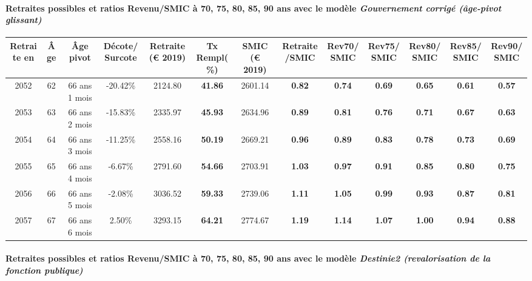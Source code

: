 \paragraph{Retraites possibles et ratios Revenu/SMIC à 70, 75, 80, 85, 90 ans avec le modèle \emph{Gouvernement corrigé (âge-pivot glissant)}}  
 
{ \scriptsize \begin{center} 
\begin{tabular}[htb]{|c|c||c|c||c|c||c||c|c|c|c|c|c|} 
\hline 
 Retraite en &  Âge &  Âge pivot &  Décote/Surcote &  Retraite (\euro{} 2019) &  Tx Rempl(\%) &  SMIC (\euro{} 2019) &  Retraite/SMIC &  Rev70/SMIC &  Rev75/SMIC &  Rev80/SMIC &  Rev85/SMIC &  Rev90/SMIC \\ 
\hline \hline 
 2052 &  62 &  66 ans 1 mois &  -20.42\% &  2124.80 &  {\bf 41.86} &  2601.14 &  {\bf {\color{red} 0.82}} &  {\bf {\color{red} 0.74}} &  {\bf {\color{red} 0.69}} &  {\bf {\color{red} 0.65}} &  {\bf {\color{red} 0.61}} &  {\bf {\color{red} 0.57}} \\ 
\hline 
 2053 &  63 &  66 ans 2 mois &  -15.83\% &  2335.97 &  {\bf 45.93} &  2634.96 &  {\bf {\color{red} 0.89}} &  {\bf {\color{red} 0.81}} &  {\bf {\color{red} 0.76}} &  {\bf {\color{red} 0.71}} &  {\bf {\color{red} 0.67}} &  {\bf {\color{red} 0.63}} \\ 
\hline 
 2054 &  64 &  66 ans 3 mois &  -11.25\% &  2558.16 &  {\bf 50.19} &  2669.21 &  {\bf {\color{red} 0.96}} &  {\bf {\color{red} 0.89}} &  {\bf {\color{red} 0.83}} &  {\bf {\color{red} 0.78}} &  {\bf {\color{red} 0.73}} &  {\bf {\color{red} 0.69}} \\ 
\hline 
 2055 &  65 &  66 ans 4 mois &  -6.67\% &  2791.60 &  {\bf 54.66} &  2703.91 &  {\bf 1.03} &  {\bf {\color{red} 0.97}} &  {\bf {\color{red} 0.91}} &  {\bf {\color{red} 0.85}} &  {\bf {\color{red} 0.80}} &  {\bf {\color{red} 0.75}} \\ 
\hline 
 2056 &  66 &  66 ans 5 mois &  -2.08\% &  3036.52 &  {\bf 59.33} &  2739.06 &  {\bf 1.11} &  {\bf 1.05} &  {\bf {\color{red} 0.99}} &  {\bf {\color{red} 0.93}} &  {\bf {\color{red} 0.87}} &  {\bf {\color{red} 0.81}} \\ 
\hline 
 2057 &  67 &  66 ans 6 mois &  2.50\% &  3293.15 &  {\bf 64.21} &  2774.67 &  {\bf 1.19} &  {\bf 1.14} &  {\bf 1.07} &  {\bf 1.00} &  {\bf {\color{red} 0.94}} &  {\bf {\color{red} 0.88}} \\ 
\hline 
\hline 
\end{tabular} 
\end{center} } 
\paragraph{Retraites possibles et ratios Revenu/SMIC à 70, 75, 80, 85, 90 ans avec le modèle \emph{Destinie2 (revalorisation de la fonction publique)}}  
 

